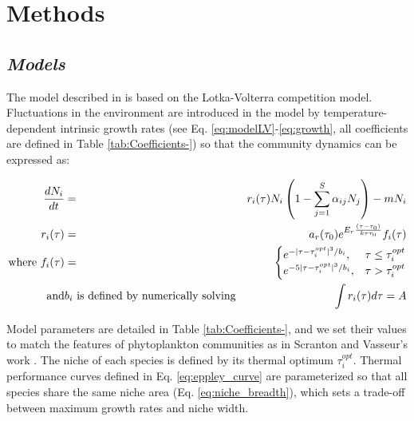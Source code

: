 \documentclass[a4paper,12pt]{article}
\begin{document}
\section{Methods}

\subsection*{\emph{Models}}

The model described in \citet{scranton_coexistence_2016} is based
on the Lotka-Volterra competition model. Fluctuations in the environment
are introduced in the model by temperature-dependent intrinsic growth
rates (see Eq. \ref{eq:modelLV}-\ref{eq:growth}, all coefficients
are defined in Table \ref{tab:Coefficients-}) so that the community
dynamics can be expressed as:

\begin{eqnarray}
\frac{dN_{i}}{dt} & = & r_{i}(\tau)N_{i}\left(1-\sum_{j=1}^{S}\alpha_{ij}N_{j}\right)-mN_{i}\label{eq:modelLV}\\
r_{i}(\tau) & = & a_{r}(\tau_{0})e^{E_{r}\frac{(\tau-\tau_{\text{0}})}{k\tau\tau_{0}}}f_{i}(\tau)\label{eq:growth}\\
\textnormal{where }f_{i}(\tau) & = & \begin{cases}
e^{-|\tau-\tau_{i}^{opt}|^{3}/b_{i}}, & \tau\leq\tau_{i}^{opt}\\
e^{-5|\tau-\tau_{i}^{opt}|^{3}/b_{i}}, & \tau>\tau_{i}^{opt}
\end{cases}\label{eq:eppley_curve}\\
\textnormal{and} & b_{i}\text{ is defined by numerically solving} & \int r_{i}(\tau)d\tau=A\label{eq:niche_breadth}
\end{eqnarray}

Model parameters are detailed in Table \ref{tab:Coefficients-}, and
we set their values to match the features of phytoplankton communities
as in Scranton and Vasseur's work \citeyearpar{scranton_coexistence_2016}.
The niche of each species is defined by its thermal optimum $\tau_{i}^{opt}$.
Thermal performance curves defined in Eq. \ref{eq:eppley_curve} are
parameterized so that all species share the same niche area (Eq. \ref{eq:niche_breadth}),
which sets a trade-off between maximum growth rates and niche width.
\end{document}

